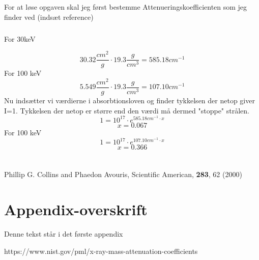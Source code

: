 \documentclass[a4paper,twoside]{article}
\begin{document}
\subsection{}
For at løse opgaven skal jeg først bestemme Attenueringskoefficienten som jeg finder ved (indsæt reference)
\subsubsection*{}For 30keV

\begin{equation*}
    30.32\frac{cm^2}{g}\cdot19.3\frac{g}{cm^3}=585.18cm^{-1}
\end{equation*}
For 100 keV
\begin{equation*}
    5.549\frac{cm^2}{g}\cdot19.3\frac{g}{cm^3}=107.10cm^{-1}
\end{equation*}
Nu indsætter vi værdierne i absorbtionsloven og finder tykkelsen der netop giver I=1. Tykkelsen der netop er større end den værdi må dermed "stoppe" strålen. 
\begin{equation*}
  1=10^{17}\cdot e^{585.18cm^{-1}\cdot x}
\end{equation*}
\begin{equation*}
    x=0.067
\end{equation*}
For 100 keV
\begin{equation*}
     1=10^{17}\cdot e^{107.10cm^{-1}\cdot x}
\end{equation*}
\begin{equation*}
    x=0.366
\end{equation*}
\newpage
\section{}
%

\begin{thebibliography}{} %
Phillip G. Collins and Phaedon Avouris, Scientific American, \textbf{283}, 62 (2000)
\end{thebibliography}

\newpage 

\appendix
\section{Appendix-overskrift}
Denne tekst står i det første appendix

https://www.nist.gov/pml/x-ray-mass-attenuation-coefficients
\end{document}
